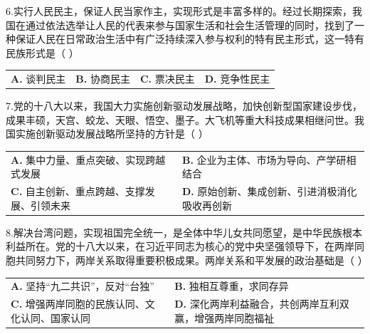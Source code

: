 \documentclass[UTF8,11pt]{ctexart}
\begin{document}
6.实行人民民主，保证人民当家作主，实现形式是丰富多样的。经过长期探索，我国在通过依法选举让人民的代表来参与国家生活和社会生活管理的同时，找到了一种保证人民在日常政治生活中有广泛持续深入参与权利的特有民主形式，这一特有民族形式是（  ）


\begin{center}\begin{tabular}{>{\raggedright\arraybackslash}p{\dimexpr(\linewidth-8\tabcolsep)/4\relax}>{\raggedright\arraybackslash}p{\dimexpr(\linewidth-8\tabcolsep)/4\relax}>{\raggedright\arraybackslash}p{\dimexpr(\linewidth-8\tabcolsep)/4\relax}>{\raggedright\arraybackslash}p{\dimexpr(\linewidth-8\tabcolsep)/4\relax}}
\textbf{A.} 谈判民主 & \textbf{B.} 协商民主 & \textbf{C.} 票决民主 & \textbf{D.} 竞争性民主\\[.35em]\end{tabular}\end{center}

7.党的十八大以来，我国大力实施创新驱动发展战略，加快创新型国家建设步伐，成果丰硕，天宫、蛟龙、天眼、悟空、墨子。大飞机等重大科技成果相继问世。我国实施创新驱动发展战略所坚持的方针是（  ）


\begin{center}\begin{tabular}{>{\raggedright\arraybackslash}p{\dimexpr(\linewidth-4\tabcolsep)/2\relax}>{\raggedright\arraybackslash}p{\dimexpr(\linewidth-4\tabcolsep)/2\relax}}
\textbf{A.} 集中力量、重点突破、实现跨越式发展 & \textbf{B.} 企业为主体、市场为导向、产学研相结合\\[.35em]
\textbf{C.} 自主创新、重点跨越、支撑发展、引领未来 & \textbf{D.} 原始创新、集成创新、引进消极消化吸收再创新\\[.35em]\end{tabular}\end{center}

8.解决台湾问题，实现祖国完全统一，是全体中华儿女共同愿望，是中华民族根本利益所在。党的十八大以来，在习近平同志为核心的党中央坚强领导下，在两岸同胞共同努力下，两岸关系取得重要积极成果。两岸关系和平发展的政治基础是（  ）


\begin{center}\begin{tabular}{>{\raggedright\arraybackslash}p{\dimexpr(\linewidth-4\tabcolsep)/2\relax}>{\raggedright\arraybackslash}p{\dimexpr(\linewidth-4\tabcolsep)/2\relax}}
\textbf{A.} 坚持“九二共识”，反对“台独” & \textbf{B.} 独相互尊重，求同存异\\[.35em]
\textbf{C.} 增强两岸同胞的民族认同、文化认同、国家认同 & \textbf{D.} 深化两岸利益融合，共创两岸互利双赢，增强两岸同胞福祉\\[.35em]\end{tabular}\end{center}
\end{document}

